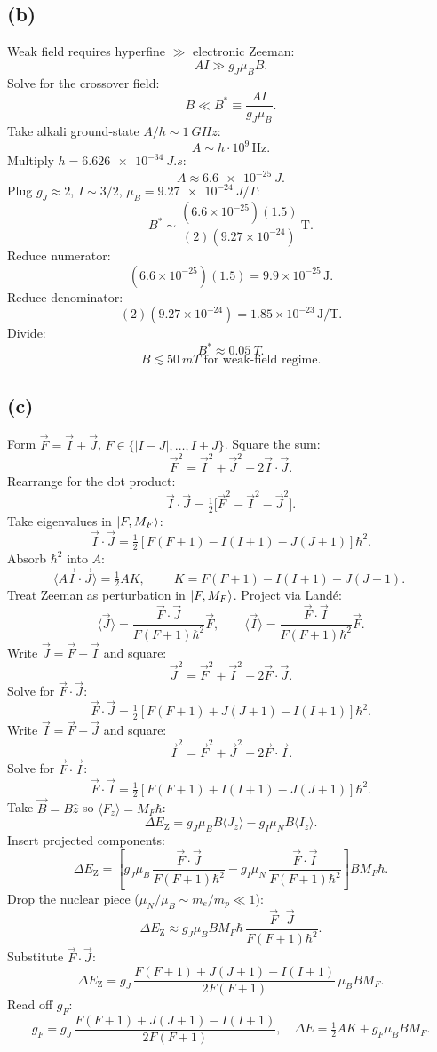 \documentclass[11pt]{article}
\begin{document}
\subsection*{(b)}

Weak field requires hyperfine $\gg$ electronic Zeeman:
\[
A I\gg g_J\mu_B B.
\]
Solve for the crossover field:
\[
B\ll B^*\equiv\frac{A I}{g_J\mu_B}.
\]
Take alkali ground-state $A/h\sim\SI{1}{GHz}$:
\[
A\sim h\cdot 10^9\,\text{Hz}.
\]
Multiply $h=\SI{6.626e-34}{J.s}$:
\[
A\approx\SI{6.6e-25}{J}.
\]
Plug $g_J\approx 2$, $I\sim 3/2$, $\mu_B=\SI{9.27e-24}{J/T}$:
\[
B^*\sim\frac{(6.6\times 10^{-25})(1.5)}{(2)(9.27\times 10^{-24})}\,\text{T}.
\]
Reduce numerator:
\[
(6.6\times 10^{-25})(1.5)=9.9\times 10^{-25}\,\text{J}.
\]
Reduce denominator:
\[
(2)(9.27\times 10^{-24})=1.85\times 10^{-23}\,\text{J/T}.
\]
Divide:
\[
B^*\approx\SI{0.05}{T}.
\]
\[
\boxed{\;B\lesssim\SI{50}{mT}\;\text{for weak-field regime.}\;}
\]

\subsection*{(c)}

Form $\vec F=\vec I+\vec J$, $F\in\{|I-J|,\dots,I+J\}$. Square the sum:
\[
\vec F^2=\vec I^2+\vec J^2+2\vec I\!\cdot\!\vec J.
\]
Rearrange for the dot product:
\[
\vec I\cdot\vec J=\tfrac12\bigl[\vec F^2-\vec I^2-\vec J^2\bigr].
\]
Take eigenvalues in $\ket{F,M_F}$:
\[
\vec I\cdot\vec J=\tfrac12[F(F+1)-I(I+1)-J(J+1)]\hbar^2.
\]
Absorb $\hbar^2$ into $A$:
\[
\langle A\vec I\cdot\vec J\rangle=\tfrac12 A K,\qquad
\boxed{\;K=F(F+1)-I(I+1)-J(J+1).\;}
\]
Treat Zeeman as perturbation in $\ket{F,M_F}$. Project via Land\'e:
\[
\langle\vec J\rangle=\frac{\vec F\!\cdot\!\vec J}{F(F+1)\hbar^2}\vec F,\qquad
\langle\vec I\rangle=\frac{\vec F\!\cdot\!\vec I}{F(F+1)\hbar^2}\vec F.
\]
Write $\vec J=\vec F-\vec I$ and square:
\[
\vec J^2=\vec F^2+\vec I^2-2\vec F\!\cdot\!\vec J.
\]
Solve for $\vec F\!\cdot\!\vec J$:
\[
\vec F\!\cdot\!\vec J=\tfrac12[F(F+1)+J(J+1)-I(I+1)]\hbar^2.
\]
Write $\vec I=\vec F-\vec J$ and square:
\[
\vec I^2=\vec F^2+\vec J^2-2\vec F\!\cdot\!\vec I.
\]
Solve for $\vec F\!\cdot\!\vec I$:
\[
\vec F\!\cdot\!\vec I=\tfrac12[F(F+1)+I(I+1)-J(J+1)]\hbar^2.
\]
Take $\vec B=B\hat z$ so $\langle F_z\rangle=M_F\hbar$:
\[
\Delta E_\text{Z}=g_J\mu_B B\langle J_z\rangle-g_I\mu_N B\langle I_z\rangle.
\]
Insert projected components:
\[
\Delta E_\text{Z}=\left[g_J\mu_B\,\frac{\vec F\!\cdot\!\vec J}{F(F+1)\hbar^2}-g_I\mu_N\,\frac{\vec F\!\cdot\!\vec I}{F(F+1)\hbar^2}\right]B M_F\hbar.
\]
Drop the nuclear piece ($\mu_N/\mu_B\sim m_e/m_p\ll 1$):
\[
\Delta E_\text{Z}\approx g_J\mu_B B M_F\hbar\,\frac{\vec F\!\cdot\!\vec J}{F(F+1)\hbar^2}.
\]
Substitute $\vec F\!\cdot\!\vec J$:
\[
\Delta E_\text{Z}=g_J\,\frac{F(F+1)+J(J+1)-I(I+1)}{2F(F+1)}\,\mu_B B M_F.
\]
Read off $g_F$:
\[
\boxed{\;g_F=g_J\,\frac{F(F+1)+J(J+1)-I(I+1)}{2F(F+1)},\quad\Delta E=\tfrac12 AK+g_F\mu_B B M_F.\;}
\]
\end{document}
